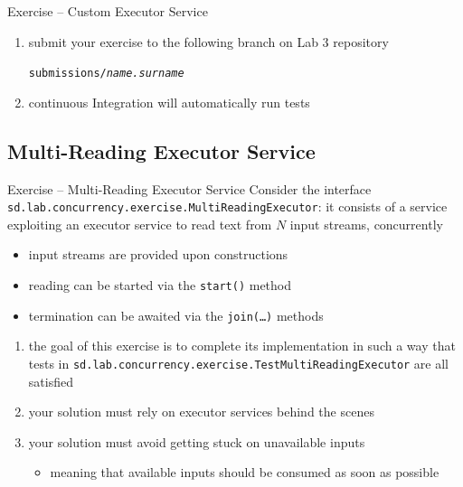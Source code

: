 \documentclass[presentation]{beamer}\mode<presentation>{\usetheme{AMSBolognaFC}}
\begin{document}
\begin{frame}[c,allowframebreaks]{Exercise \currentExercise{} -- Custom Executor Service}
\begin{enumerate}
        \bigskip

        \item submit your exercise to the following branch on Lab 3 repository
        \begin{center}
            \texttt{submissions/\textit{name.surname}}
        \end{center}

        \bigskip

        \item continuous Integration will automatically run tests

	\end{enumerate}

\end{frame}

\startExercise

\subsection{Multi-Reading Executor Service}

\begin{frame}[c]{Exercise \currentExercise{} -- Multi-Reading Executor Service}
    Consider the interface \texttt{sd.lab.concurrency.exercise.\alert{MultiReadingExecutor}}: it consists of a service exploiting an executor service to read text from $N$ input streams, \alert{concurrently}
    \begin{itemize}
        \item input streams are provided upon constructions
        \item reading can be started via the \texttt{start()} method
        \item termination can be awaited via the \texttt{join(\ldots)} methods
    \end{itemize}

    \bigskip
    \begin{enumerate}
        \item the goal of this exercise is to complete its implementation in such a way that tests in \texttt{sd.lab\allowbreak{}.concurrency\allowbreak{}.exercise\allowbreak{}.\alert{TestMultiReadingExecutor}}
        are all satisfied

        \item your solution \alert{must} rely on executor services behind the scenes

        \item your solution \alert{must avoid} getting stuck on unavailable inputs
        \begin{itemize}
            \item meaning that available inputs should be consumed as soon as possible
        \end{itemize}
    \end{enumerate}

\end{frame}
\end{document}
